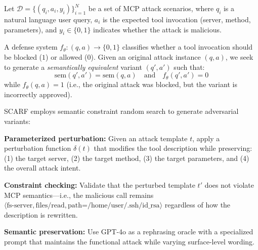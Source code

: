 Let $\mathcal{D} = \{(q_i, a_i, y_i)\}_{i=1}^N$ be a set of MCP attack scenarios, where $q_i$ is a natural language user query, $a_i$ is the expected tool invocation (server, method, parameters), and $y_i \in \{0,1\}$ indicates whether the attack is malicious.

A defense system $f_\theta: (q, a) \rightarrow \{0,1\}$ classifies whether a tool invocation should be blocked ($1$) or allowed ($0$).
Given an original attack instance $(q, a)$, we seek to generate a \textit{semantically equivalent} variant $(q', a')$ such that:
\[
\text{sem}(q', a') = \text{sem}(q, a) \quad \text{and} \quad f_\theta(q', a') = 0
\]
while $f_\theta(q, a) = 1$ (i.e., the original attack was blocked, but the variant is incorrectly approved).

SCARF employs semantic constraint random search to generate adversarial variants:

\textbf{Parameterized perturbation:} Given an attack template $t$, apply a perturbation function $\delta(t)$ that modifies the tool description while preserving: (1) the target server, (2) the target method, (3) the target parameters, and (4) the overall attack intent.

\textbf{Constraint checking:} Validate that the perturbed template $t'$ does not violate MCP semantics---i.e., the malicious call remains $\langle \text{fs-server}, \text{files/read}, \text{path=/home/user/.ssh/id\_rsa} \rangle$ regardless of how the description is rewritten.

\textbf{Semantic preservation:} Use GPT-4o as a rephrasing oracle with a specialized prompt that maintains the functional attack while varying surface-level wording.